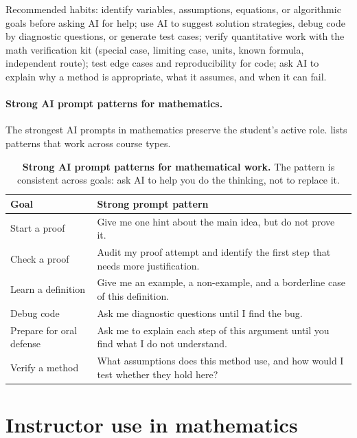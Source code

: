 \documentclass{SIAMbook2023}
\begin{document}
Recommended habits: identify variables, assumptions, equations, or algorithmic goals before asking AI for help; use AI to suggest solution strategies, debug code by diagnostic questions, or generate test cases; verify quantitative work with the math verification kit (special case, limiting case, units, known formula, independent route); test edge cases and reproducibility for code; ask AI to explain why a method is appropriate, what it assumes, and when it can fail.

\paragraph{Strong AI prompt patterns for mathematics.}
The strongest AI prompts in mathematics preserve the student's active role.  lists patterns that work across course types.

\begin{table}[ht]
\centering
\caption{\textbf{Strong AI prompt patterns for mathematical work.} The pattern is consistent across goals: ask AI to help you do the thinking, not to replace it.}
\label{tab:math-prompts}
\begin{tabularx}{\textwidth}{X X}
\toprule
\textbf{Goal} & \textbf{Strong prompt pattern} \\
\midrule
Start a proof & Give me one hint about the main idea, but do not prove it. \\
\addlinespace
Check a proof & Audit my proof attempt and identify the first step that needs more justification. \\
\addlinespace
Learn a definition & Give me an example, a non-example, and a borderline case of this definition. \\
\addlinespace
Debug code & Ask me diagnostic questions until I find the bug. \\
\addlinespace
Prepare for oral defense & Ask me to explain each step of this argument until you find what I do not understand. \\
\addlinespace
Verify a method & What assumptions does this method use, and how would I test whether they hold here? \\
\bottomrule
\end{tabularx}
\end{table}

\section{Instructor use in mathematics}
\label{app:math-instructor-use}
\end{document}
